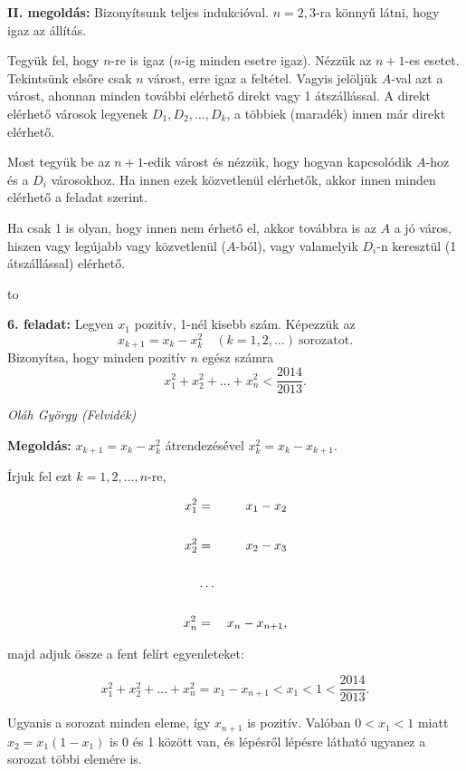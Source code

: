 \documentclass[a4paper,10pt]{article}
\newcommand{\ki}[2]{\hfill {\it #1 (#2)}\medskip}
\newcommand{\vonal}{\hbox to \hsize{\hskip2truecm\hrulefill\hskip2truecm}}
\begin{document}
{\bf II. megoldás: } Bizonyítsunk teljes indukcióval.
$n = 2, 3$-ra könnyű látni, hogy igaz az állítás.

Tegyük fel, hogy $n$-re is igaz ($n$-ig minden esetre igaz). Nézzük az $n+1$-es esetet.
Tekintsünk elsőre csak $n$ várost, erre igaz a feltétel. Vagyis jelöljük $A$-val azt a várost,
ahonnan minden további elérhető direkt vagy 1 átszállással. A direkt elérhető városok
legyenek $D_1, D_2, \ldots, D_k$, a többiek (maradék) innen már direkt elérhető.

Most tegyük be az $n+1$-edik várost és nézzük, hogy hogyan kapcsolódik $A$-hoz és a $D_i$
városokhoz. Ha innen ezek közvetlenül elérhetők, akkor innen minden elérhető a feladat
szerint.

Ha csak 1 is olyan, hogy innen nem érhető el, akkor továbbra is az $A$ a jó város, hiszen
vagy legújabb vagy közvetlenül ($A$-ból), vagy valamelyik $D_i$-n keresztül (1 átszállással)
elérhető.

\medskip

\vonal


{\bf 6. feladat: } Legyen $x_1$
pozitív, 1-nél kisebb szám. Képezzük az
$$x_{k+1}=x_k-x_k^2\quad (k=1,2,\ldots)\ \text{sorozatot.}$$
Bizonyítsa, hogy minden pozitív $n$ egész számra
$$x_1^2+x_2^2+\ldots+x_n^2<\frac{2014}{2013}.$$

\ki{Oláh György}{Felvidék}\medskip

{\bf Megoldás: } $x_{k+1}=x_k-x_k^2$ átrendezésével
$x_k^2=x_k-x_{k+1}$.

Írjuk fel ezt $k=1, 2, \ldots, n$-re, 

\begin{eqnarray*}
x_1^2 & = & x_1-x_2 \cr \cr
x_2^2 & = & x_2-x_3 \cr \cr
 & \ldots &  \cr \cr
x_n^2 & = & x_n-x_{n+1},
\end{eqnarray*}

majd adjuk össze a fent felírt egyenleteket:

$$x_1^2+x_2^2+\ldots+x_n^2= 
x_1-x_{n+1}<x_1<1<\frac{2014}{2013}.
$$

Ugyanis a sorozat minden eleme, így $x_{n+1}$ is pozitív. Valóban $0<x_1<1$ miatt $x_2=x_1(1-x_1)$
is 0 és 1 között van, és lépésről lépésre látható ugyanez a sorozat többi elemére is.
\end{document}
